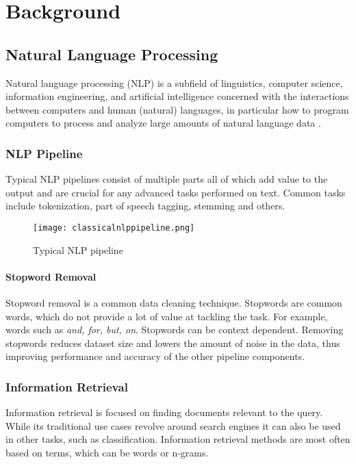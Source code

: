 \chapter{Background}
\section{Natural Language Processing}
Natural language processing (NLP) is a subfield of linguistics, computer science, information engineering, and artificial intelligence concerned with the interactions between computers and human (natural) languages, in particular how to program computers to process and analyze large amounts of natural language data \cite{nlpdefinition}.

\subsection{NLP Pipeline}
Typical NLP pipelines consist of multiple parts all of which add value to the output and are crucial for any advanced tasks performed on text. Common tasks include tokenization, part of speech tagging, stemming and others.

\begin{figure}[H]
\begin{center}
\texttt{[image: classicalnlppipeline.png]}
\caption{Typical NLP pipeline \cite{nlppipeline}}
\end{center}
\end{figure}

\subsubsection{Stopword Removal}
Stopword removal is a common data cleaning technique. Stopwords are common words, which do not provide a lot of value at tackling the task. For example, words such as \textit{and, for, but, on}. Stopwords can be context dependent. Removing stopwords reduces dataset size and lowers the amount of noise in the data, thus improving performance and accuracy of the other pipeline components.

\subsection{Information Retrieval}
Information retrieval is focused on finding documents relevant to the query. While its traditional use cases revolve around search engines it can also be used in other tasks, such as classification. Information retrieval methods are most often based on terms, which can be words or n-grams.

